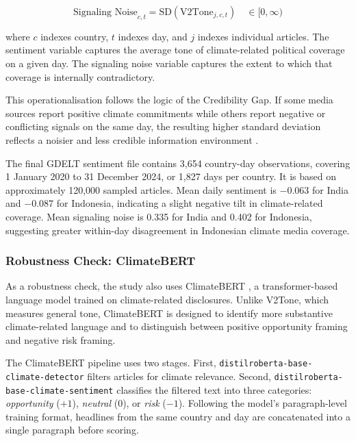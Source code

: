 \documentclass[12pt,a4paper]{article}
\begin{document}
\begin{equation}
\text{Signaling Noise}_{c,t} = \text{SD}\left(\text{V2Tone}_{j,c,t}\right)
\quad \in [0, \infty)
\label{eq:noise}
\end{equation}

\noindent where $c$ indexes country, $t$ indexes day, and $j$ indexes individual articles. The sentiment variable captures the average tone of climate-related political coverage on a given day. The signaling noise variable captures the extent to which that coverage is internally contradictory.

This operationalisation follows the logic of the Credibility Gap. If some media sources report positive climate commitments while others report negative or conflicting signals on the same day, the resulting higher standard deviation reflects a noisier and less credible information environment \citep{Neumann2025}.

The final GDELT sentiment file contains 3,654 country-day observations, covering 1 January 2020 to 31 December 2024, or 1,827 days per country. It is based on approximately 120,000 sampled articles. Mean daily sentiment is $-0.063$ for India and $-0.087$ for Indonesia, indicating a slight negative tilt in climate-related coverage. Mean signaling noise is 0.335 for India and 0.402 for Indonesia, suggesting greater within-day disagreement in Indonesian climate media coverage.

\subsubsection{Robustness Check: ClimateBERT}

As a robustness check, the study also uses ClimateBERT \citep{Webersinke2022}, a transformer-based language model trained on climate-related disclosures. Unlike V2Tone, which measures general tone, ClimateBERT is designed to identify more substantive climate-related language and to distinguish between positive opportunity framing and negative risk framing.

The ClimateBERT pipeline uses two stages. First, \texttt{distilroberta-base-climate-detector} filters articles for climate relevance. Second, \texttt{distilroberta-base-climate-sentiment} classifies the filtered text into three categories: \textit{opportunity} ($+1$), \textit{neutral} ($0$), or \textit{risk} ($-1$). Following the model’s paragraph-level training format, headlines from the same country and day are concatenated into a single paragraph before scoring.
\end{document}
